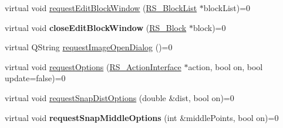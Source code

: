 \begin{DoxyCompactItemize}
\item 
virtual void \hyperlink{classRS__DialogFactoryInterface_ad9897be7951513acd0dddc536a9c8619}{request\-Edit\-Block\-Window} (\hyperlink{classRS__BlockList}{R\-S\-\_\-\-Block\-List} $\ast$block\-List)=0
\item 
\hypertarget{classRS__DialogFactoryInterface_a9bbf67b4fc131697d915e59931b2b0aa}{virtual void {\bfseries close\-Edit\-Block\-Window} (\hyperlink{classRS__Block}{R\-S\-\_\-\-Block} $\ast$block)=0}\label{classRS__DialogFactoryInterface_a9bbf67b4fc131697d915e59931b2b0aa}

\item 
virtual Q\-String \hyperlink{classRS__DialogFactoryInterface_ac9593d3c8e0c2d28ee95972106a92074}{request\-Image\-Open\-Dialog} ()=0
\item 
virtual void \hyperlink{classRS__DialogFactoryInterface_a7007dbb4c883dda6cf63939d0eebb341}{request\-Options} (\hyperlink{classRS__ActionInterface}{R\-S\-\_\-\-Action\-Interface} $\ast$action, bool on, bool update=false)=0
\item 
virtual void \hyperlink{classRS__DialogFactoryInterface_ac9fcb3ea665066b9d70af8360d0e136f}{request\-Snap\-Dist\-Options} (double \&dist, bool on)=0
\item 
\hypertarget{classRS__DialogFactoryInterface_adfc6a75501e67d5aae64eda89950be3f}{virtual void {\bfseries request\-Snap\-Middle\-Options} (int \&middle\-Points, bool on)=0}\label{classRS__DialogFactoryInterface_adfc6a75501e67d5aae64eda89950be3f}


\end{DoxyCompactItemize}
